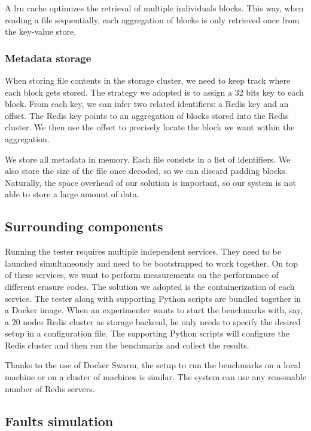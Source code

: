 A \ac{lru} cache optimizes the retrieval of multiple individuals blocks.
This way, when reading a file sequentially, each aggregation of blocks is only retrieved once from the key-value store.

\subsubsection{Metadata storage}

When storing file contents in the storage cluster, we need to keep track where each block gets stored.
The strategy we adopted is to assign a 32 bits key to each block.
From each key, we can infer two related identifiers: a Redis key and an offset.
The Redis key points to an aggregation of blocks stored into the Redis cluster.
We then use the offset to precisely locate the block we want within the aggregation.

We store all metadata in memory.
Each file consists in a list of identifiers.
We also store the size of the file once decoded, so we can discard padding blocks.
Naturally, the space overhead of our solution is important, so our system is not able to store a large amount of data.

\subsection{Surrounding components}

Running the tester requires multiple independent services.
They need to be launched simultaneously and need to be bootstrapped to work together.
On top of these services, we want to perform measurements on the performance of different erasure codes.
The solution we adopted is the containerization of each service.
The tester along with supporting Python scripts are bundled together in a Docker image.
When an experimenter wants to start the benchmarks with, say, a 20 nodes Redis cluster as storage backend, he only needs to specify the desired setup in a configuration file.
The supporting Python scripts will configure the Redis cluster and then run the benchmarks and collect the results.

Thanks to the use of Docker Swarm, the setup to run the benchmarks on a local machine or on a cluster of machines is similar.
The system can use any reasonable number of Redis servers.

\subsection{Faults simulation}

